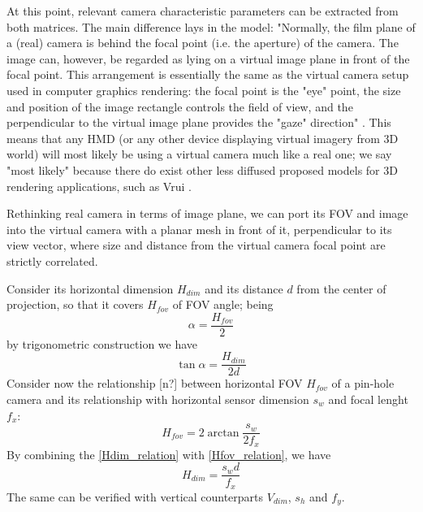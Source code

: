 At this point, relevant camera characteristic parameters can be extracted from both matrices. The main difference lays in the model: "Normally, the film plane of a (real) camera is behind the focal point (i.e. the aperture) of the camera. The image can, however, be regarded as lying on a virtual image plane in front of the focal point. This arrangement is essentially the same as the virtual camera setup used in computer graphics rendering: the focal point is the "eye" point, the size and position of the image rectangle controls the field of view, and the perpendicular to the virtual image plane provides the "gaze" direction" \cite{cg_rendering}. This means that any HMD (or any other device displaying virtual imagery from 3D world) will most likely be using a virtual camera much like a real one; we say "most likely" because there do exist other less diffused proposed models for 3D rendering applications, such as Vrui \cite{link_vrui}.

Rethinking real camera in terms of image plane, we can port its FOV and image into the virtual camera with a planar mesh in front of it, perpendicular to its view vector, where size and distance from the virtual camera focal point are strictly correlated.

Consider its horizontal dimension $H_{dim}$ and its distance $d$ from the center of projection, so that it covers $H_{fov}$ of FOV angle; being
\begin{equation}
\alpha = \frac {H_{fov}} {2}
\end{equation}
by trigonometric construction we have
\begin{equation}
\tan \alpha = \frac {H_{dim}} {2 d}
\label{Hdim_relation}
\end{equation}
Consider now the relationship [n?] between horizontal FOV $H_{fov}$ of a pin-hole camera and its relationship with horizontal sensor dimension $s_{w}$ and focal lenght $f_x$: 
\begin{equation}
H_{fov} = 2 \arctan \frac {s_{w}} {2 f_x}
\label{Hfov_relation}
\end{equation}
By combining the \ref{Hdim_relation} with \ref{Hfov_relation}, we have 
\begin{equation}
H_{dim} = \frac {s_{w} d} {f_x}
\label{fov_distance_relation}
\end{equation}
The same can be verified with vertical counterparts $V_{dim}$, $s_{h}$ and $f_y$.

